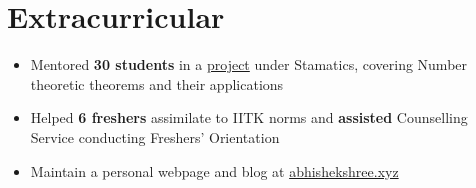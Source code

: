 \section*{\sc Extracurricular}
\vspace{-2mm}
\hrulefill
\vspace{1mm}

\begin{itemize}
  \item Mentored \textbf{30 students} in a  \href{https://abhishekshree.github.io/number-theory-applications}{project} under Stamatics, covering Number theoretic theorems and their applications
  \item Helped \textbf{6 freshers} assimilate to IITK norms and \textbf{assisted} Counselling Service conducting Freshers' Orientation
  \item Maintain a personal webpage and blog at \href{https://abhishekshree.xyz/}{abhishekshree.xyz}
\end{itemize}
